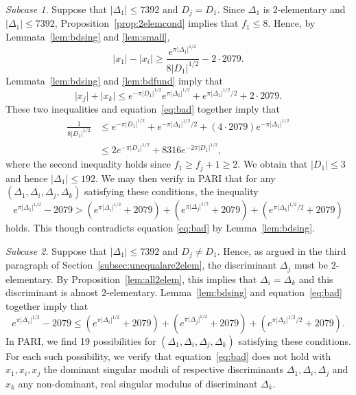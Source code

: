\documentclass[12pt,a4paper,oneside]{amsart}
\begin{document}
\textit{Subcase 1.}
Suppose that $\lvert \Delta_1 \rvert \leq 7392$ and $D_j = D_1$. 
Since $\Delta_1$ is $2$-elementary and $\lvert \Delta_1 \rvert \leq 7392$, Proposition~\ref{prop:2elemcond} implies that $f_1 \leq 8$. Hence, by Lemmata~\ref{lem:bdsing} and \ref{lem:small},
\[ \lvert x_1 \rvert - \lvert x_i \rvert \geq \frac{e^{\pi \lvert \Delta_1 \rvert^{1/2}}}{8 \lvert D_1 \rvert^{1/2}} - 2 \cdot 2079.\]
Lemmata~\ref{lem:bdsing} and \ref{lem:bdfund} imply that
\[ \lvert x_j \rvert + \lvert x_k \rvert \leq e^{- \pi \lvert D_1 \rvert^{1/2}} e^{\pi \lvert \Delta_1 \rvert^{1/2}} + e^{\pi \lvert \Delta_1 \rvert^{1/2}/2} + 2 \cdot 2079.\]
These two inequalities and equation~\eqref{eq:bad} together imply that
\begin{align*} 
\frac{1}{8 \lvert D_1 \rvert^{1/2}} &\leq  e^{-\pi \lvert D_1 \rvert^{1/2}} + e^{-\pi \lvert \Delta_1 \rvert^{1/2}/2} + (4 \cdot 2079) e^{ - \pi \lvert \Delta_1 \rvert^{1/2}}\\
&\leq  2 e^{-\pi \lvert D_1 \rvert^{1/2}} +8316 e^{-2 \pi \lvert D_1 \rvert^{1/2}},
\end{align*}
where the second inequality holds since $f_1 \geq f_j + 1 \geq 2$. We obtain that $\lvert D_1 \rvert \leq 3$ and hence $\lvert \Delta_1 \rvert \leq 192$. We may then verify in PARI that for any $(\Delta_1, \Delta_i, \Delta_j, \Delta_k)$ satisfying these conditions, the inequality
\begin{equation} \label{eq:4disc1} e^{\pi \lvert \Delta_1 \rvert^{1/2}} - 2079 > (e^{\pi \lvert \Delta_i \rvert^{1/2}} + 2079) + (e^{\pi \lvert \Delta_j \rvert^{1/2}} + 2079) + (e^{\pi \lvert \Delta_k \rvert^{1/2}/2} + 2079)\end{equation}
holds. This though contradicts equation \eqref{eq:bad} by Lemma~\ref{lem:bdsing}.

\textit{Subcase 2.}
Suppose that $\lvert \Delta_1 \rvert \leq 7392$ and  $D_j \neq D_1$. 
Hence, as argued in the third paragraph of Section~\ref{subsec:unequalare2elem}, the discriminant $\Delta_j$ must be $2$-elementary. By Proposition~\ref{lem:all2elem}, this implies that $\Delta_i = \Delta_k$ and this discriminant is almost $2$-elementary. Lemma~\ref{lem:bdsing} and equation~\eqref{eq:bad} together imply that 
\begin{equation} \label{eq:4disc2} e^{\pi \lvert \Delta_1 \rvert^{1/2}} - 2079 \leq (e^{\pi \lvert \Delta_i \rvert^{1/2}} + 2079) + (e^{\pi \lvert \Delta_j \rvert^{1/2}} + 2079) + (e^{\pi \lvert \Delta_k \rvert^{1/2}/2} + 2079).\end{equation}
In PARI, we find 19 possibilities for $(\Delta_1, \Delta_i, \Delta_j, \Delta_k)$ satisfying these conditions. For each such possibility, we verify that equation~\eqref{eq:bad} does not hold with $x_1, x_i, x_j$ the dominant singular moduli of respective discriminants $\Delta_1, \Delta_i, \Delta_j$ and $x_k$ any non-dominant, real singular modulus of discriminant $\Delta_k$.
\end{document}
